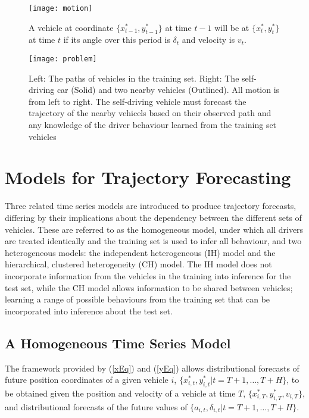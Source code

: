 \documentclass[12pt,a4paper]{article}\usepackage[]{graphicx}\usepackage[]{color}
\begin{document}
\begin{figure}
\centering
\texttt{[image: motion]}
\caption{A vehicle at coordinate $\{x^*_{t-1}, y^*_{t-1}\}$ at time $t-1$ will be at $\{x^*_t, y^*_t\}$ at time $t$ if its angle over this period is $\delta_t$ and velocity is $v_t$.}
\label{fig:motion}
\end{figure}

\begin{figure}
\centering
\texttt{[image: problem]}
\caption{Left: The paths of vehicles in the training set. Right: The self-driving car (Solid) and two nearby vehicles (Outlined). All motion is from left to right. The self-driving vehicle must forecast the trajectory of the nearby vehicels based on their observed path and any knowledge of the driver behaviour learned from the training set vehicles}
\label{fig:problem}
\end{figure}

\section{Models for Trajectory Forecasting}
\label{sec:models}

Three related time series models are introduced to produce trajectory forecasts, differing by their implications about the dependency between the different sets of vehicles. These are referred to as the homogeneous model, under which all drivers are treated identically and the training set is used to infer all behaviour, and two heterogeneous models: the independent heterogeneous (IH) model and the hierarchical, clustered heterogeneity (CH) model. The IH model does not incorporate information from the vehicles in the training into inference for the test set, while the CH model allows information to be shared between vehicles; learning a range of possible behaviours from the training set that can be incorporated into inference about the test set. 
\\

\subsection{A Homogeneous Time Series Model}
\label{subsec:homogeneous}

The framework provided by (\ref{xEq}) and (\ref{yEq}) allows distributional forecasts of future position coordinates of a given vehicle $i$, $\{x^*_{i, t}, y^*_{i, t} | t = T + 1, \dots, T+H\}$, to be obtained given the position and velocity of a vehicle at time $T$, $\{x^*_{i, T}, y^*_{i, T}, v_{i, T}\}$, and distributional forecasts of the future values of $\{a_{i, t}, \delta_{i, t} | t = T + 1, \dots, T+H\}$.  
\\
\end{document}
